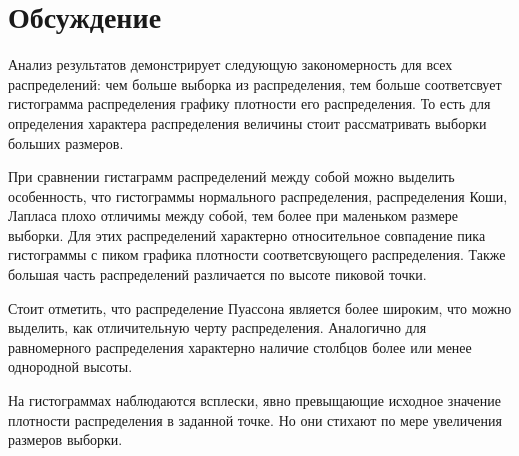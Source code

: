 ﻿\documentclass[12pt,a4paper]{article}
\begin{document}
\section{Обсуждение}
Анализ результатов демонстрирует следующую закономерность для всех распределений: чем больше выборка из распределения, тем больше соответсвует гистограмма распределения графику плотности его распределения. То есть для определения характера распределения величины стоит рассматривать выборки больших размеров.

При сравнении гистаграмм распределений между собой можно выделить особенность, что гистограммы нормального распределения, распределения Коши, Лапласа плохо отличимы между собой, тем более при маленьком размере выборки. Для этих распределений характерно относительное совпадение пика гистограммы с пиком графика плотности соответсвующего распределения. Также большая часть распределений различается по высоте пиковой точки.

Стоит отметить, что распределение Пуассона является более широким, что можно выделить, как отличительную черту распределения. Аналогично для равномерного распределения характерно наличие столбцов более или менее однородной высоты.

На гистограммах наблюдаются всплески, явно превыщающие исходное значение плотности распределения в заданной точке. Но они стихают по мере увеличения размеров выборки.
\end{document}
